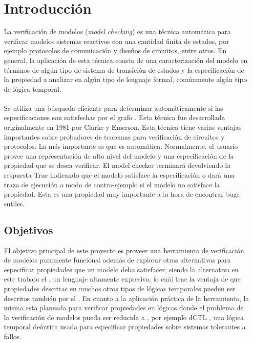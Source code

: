 \chapter{Introducción}
\noindent La verificación de modelos (\emph{model checking}) es una técnica automática para verificar modelos sistemas reactivos con una cantidad finita de estados, por ejemplo protocolos de comunicación y diseños de circuitos, entre otros. En general, la aplicación de esta técnica consta de una caracterización del modelo en términos de algún tipo de sistema de transición de estados y la especificación de la propiedad a analizar en algún tipo de lenguaje formal, comúnmente algún tipo de lógica temporal.\\
\\
\noindent Se utiliza una búsqueda eficiente para determinar automáticamente si las especificaciones son satisfechas por el grafo \cite{Clarke:5}. Esta técnica fue desarrollada originalmente en 1981 por Clarke y Emerson. Esta técnica tiene varias ventajas importantes sobre probadores de teoremas para verificación de circuitos y protocolos. La más importante es que es automática. Normalmente, el usuario provee una representación de alto nivel del modelo y una especificación de la propiedad que se desea verificar. El model checker terminará devolviendo la respuesta True indicando que el modelo satisface la especificación o dará una traza de ejecución a modo de contra-ejemplo si el modelo no satisface la propiedad. Esta es una propiedad muy importante a la hora de encontrar bugs sutiles.

\section{Objetivos}
El objetivo principal de este proyecto es proveer una herramienta de verificación de modelos puramente funcional además de explorar otras alternativas para especificar propiedades que un modelo deba satisfacer, siendo la alternativa en este trabajo el {\mucalculo}, un lenguaje altamente expresivo, lo cuál trae la ventaja de que propiedades descritas en muchos otros tipos de lógicas temporales pueden ser descritos también por el {\mucalculo}. En cuanto a la aplicación práctica de la herramienta, la misma esta planeada para verificar propiedades en lógicas donde el problema de la verificación de modelos pueda ser reducida a {\mucalculo}, por ejemplo dCTL \cite{Castro:9}, una lógica temporal deóntica usada para especificar propiedades sobre sistemas tolerantes a fallos.

